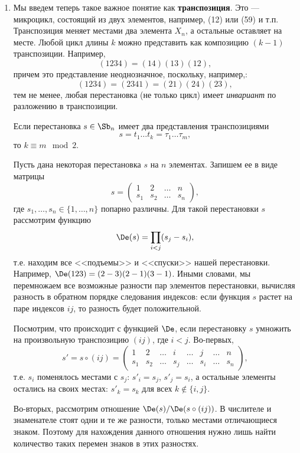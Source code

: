 \begin{enumerate}
\item Мы введем теперь такое важное понятие как \textbf{транспозиция}. Это --- микроцикл, состоящий из двух элементов, например, (12) или (59) и т.п. Транспозиция меняет местами два элемента $X_n$, а остальные оставляет на месте. Любой цикл длины $k$ можно представить как композицию $(k-1)$ транспозиции. Например,\label{transpose}
$$
(1234) = (14)(13)(12),
$$
причем это представление неоднозначное, поскольку, например,:
$$
(1234) = (2341) = (21)(24)(23),
$$
тем не менее, любая перестановка (не только цикл) имеет \textit{инвариант} по разложению в транспозиции.
\begin{thrm}
Если перестановка $s\in\Sb_n$ имеет два представления транспозициями
$$
s=t_1\dots t_k=\tau_1\dots\tau_m,
$$
то $k\equiv m\mod 2$.
\end{thrm}
\pf
Пусть дана некоторая перестановка $s$ на $n$ элементах. Запишем ее в виде матрицы
$$
s=\begin{pmatrix}
1 & 2 & \dots & n \\
s_1 & s_2 & \dots & s_n
\end{pmatrix},
$$
где $s_1,\dots, s_n\in\{1,\dots,n\}$ попарно различны. Для такой перестановки $s$ рассмотрим функцию
\begin{equation}\label{DeltaS}
\De(s) = \prod_{i<j}(s_j-s_i),
\end{equation}
т.е. находим все <<подъемы>> и <<спуски>> нашей перестановки. Например, $\De(123)=(2-3)(2-1)(3-1)$. Иными словами, мы перемножаем все возможные разности пар элементов перестановки, вычисляя разность в обратном порядке следования индексов: если функция $s$ растет на паре индексов $ij$, то разность будет положительной.

Посмотрим, что происходит с функцией $\De$, если перестановку $s$ умножить на произвольную транспозицию $(ij)$, где $i<j$. Во-первых,
$$
s' = s\circ (ij) = \begin{pmatrix}
1 & 2 & \dots & i & \dots & j & \dots & n \\
s_1 & s_2 & \dots & s_j & \dots & s_i & \dots & s_n
\end{pmatrix},
$$
т.е. $s_i$ поменялось местами с $s_j$: $s'_i=s_j$, $s'_j=s_i$, а остальные элементы остались на своих местах: $s'_k=s_k$ для всех $k\notin\{i,j\}$. 

Во-вторых, рассмотрим отношение $\De(s)/\De(s\circ(ij))$. В числителе и знаменателе стоят одни и те же разности, только местами отличающиеся знаком. Поэтому для нахождения данного отношения нужно лишь найти количество таких перемен знаков в этих разностях.


\end{enumerate}
